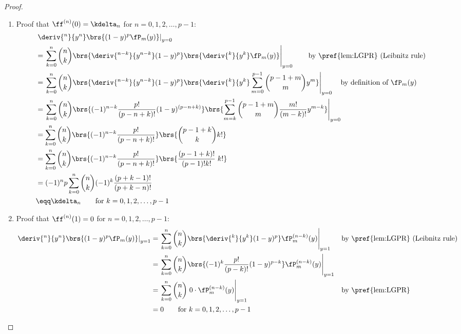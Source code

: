 \begin{proof}
\begin{enumerate}
  \item Proof that $\ff^{(n)}(0)=\kdelta_n$ for $n=0,1,2,\ldots,p-1$:
  \begin{align*}
  &\left.\deriv{^n}{y^n}\brs{ (1-y)^p \fP_m(y) }\right|_{y=0}
  \\&= \left.
       \sum_{k=0}^n {n\choose k}
       \brs{\deriv{^{n-k}}{y^{n-k}} (1-y)^p }
       \brs{\deriv{^k}{y^k}\fP_m(y) }
       \right|_{y=0}
    \qquad\text{by \pref{lem:LGPR} (Leibnitz rule)}
  \\&= \left.
       \sum_{k=0}^n {n\choose k}
       \brs{\deriv{^{n-k}}{y^{n-k}} (1-y)^p }
       \brs{\deriv{^k}{y^k} \sum_{m=0}^{p-1}{p-1+m \choose m} y^m }
       \right|_{y=0}
    \quad\text{by definition of $\fP_m(y)$}
  \\&= \left.
       \sum_{k=0}^n {n\choose k}
       \brs{(-1)^{n-k}\frac{p!}{(p-n+k)!} (1-y)^{(p-n+k)} }
       \brs{\sum_{m=k}^{p-1}{p-1+m \choose m} \frac{m!}{(m-k)!}y^{m-k} }
       \right|_{y=0}
  \\&= \sum_{k=0}^n {n\choose k}
       \brs{(-1)^{n-k}\frac{p!}{(p-n+k)!}}
       \brs{{p-1+k \choose k} k! }
  \\&= \sum_{k=0}^n {n\choose k}
       \brs{(-1)^{n-k}\frac{p!}{(p-n+k)!}}
       \brs{\frac{(p-1+k)!}{(p-1)!k!}\; k! }
  \\&= (-1)^n p
       \sum_{k=0}^n {n\choose k}
       (-1)^k\frac{(p+k-1)!}{(p+k-n)!}
  \\&\eqq \kdelta_n \qquad \text{for } k=0,1,2,\ldots,p-1
  \end{align*}

  \item Proof that $\ff^{(n)}(1)=0$ for $n=0,1,2,\ldots,p-1$:
  \begin{align*}
  \left.\deriv{^n}{y^n}\brs{ (1-y)^p \fP_m(y) }\right|_{y=1}
    &= \left.
       \sum_{k=0}^n {n\choose k}
       \brs{\deriv{^k}{y^k} (1-y)^p }
       \fP_m^{(n-k)}(y)
       \right|_{y=1}
    && \text{by \pref{lem:LGPR} (Leibnitz rule)}
  \\&= \left.
       \sum_{k=0}^n {n\choose k}
       \brs{(-1)^k\frac{p!}{(p-k)!} (1-y)^{p-k} }
       \fP_m^{(n-k)}(y)
       \right|_{y=1}
  \\&= \left.
       \sum_{k=0}^n {n\choose k} \; 0\cdot
       \fP_m^{(n-k)}(y)
       \right|_{y=1}
    && \text{by \pref{lem:LGPR}}
  \\&= 0 \qquad \text{for } k=0,1,2,\ldots,p-1
  \end{align*}
\end{enumerate}
\end{proof}






